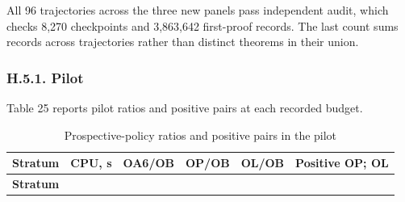 \documentclass[pdflatex,sn-basic,Numbered]{sn-jnl}
\begin{document}
All 96 trajectories across the three new panels pass independent audit, which checks 8,270 checkpoints and 3,863,642 first-proof records. The last count sums records across trajectories rather than distinct theorems in their union.

\subsubsection*{H.5.1. Pilot}\label{h.5.1.-pilot}

Table 25 reports pilot ratios and positive pairs at each recorded budget.

\begingroup
\small
\setlength{\tabcolsep}{3pt}
\renewcommand{\arraystretch}{1.13}

\begin{longtable}[]{@{}
  >{\raggedright\arraybackslash}p{}
  >{\raggedleft\arraybackslash}p{}
  >{\raggedleft\arraybackslash}p{}
  >{\raggedleft\arraybackslash}p{}
  >{\raggedleft\arraybackslash}p{}
  >{\raggedright\arraybackslash}p{}@{}}
\caption{Prospective-policy ratios and positive pairs in the pilot}\label{tab:25}\tabularnewline
\toprule\noalign{}
\begin{minipage}[b]{\linewidth}\raggedright
\textbf{Stratum}
\end{minipage} & \begin{minipage}[b]{\linewidth}\raggedleft
\textbf{CPU, s}
\end{minipage} & \begin{minipage}[b]{\linewidth}\raggedleft
\textbf{OA6/OB}
\end{minipage} & \begin{minipage}[b]{\linewidth}\raggedleft
\textbf{OP/OB}
\end{minipage} & \begin{minipage}[b]{\linewidth}\raggedleft
\textbf{OL/OB}
\end{minipage} & \begin{minipage}[b]{\linewidth}\raggedright
\textbf{Positive OP; OL}
\end{minipage} \\
\midrule\noalign{}
\endfirsthead
\toprule\noalign{}
\begin{minipage}[b]{\linewidth}\raggedright
\textbf{Stratum}

\end{minipage}
\end{longtable}
\end{document}
